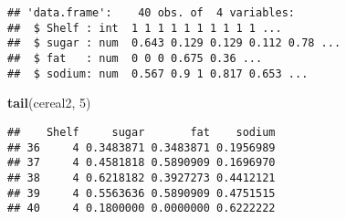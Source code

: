 \documentclass[]{article}
\newenvironment{Shaded}{\begin{snugshade}}{\end{snugshade}}
\newcommand{\DecValTok}[1]{\textcolor[rgb]{0.00,0.00,0.81}{#1}}
\newcommand{\KeywordTok}[1]{\textcolor[rgb]{0.13,0.29,0.53}{\textbf{#1}}}
\newcommand{\NormalTok}[1]{#1}
\begin{document}
\begin{verbatim}
## 'data.frame':    40 obs. of  4 variables:
##  $ Shelf : int  1 1 1 1 1 1 1 1 1 1 ...
##  $ sugar : num  0.643 0.129 0.129 0.112 0.78 ...
##  $ fat   : num  0 0 0 0.675 0.36 ...
##  $ sodium: num  0.567 0.9 1 0.817 0.653 ...
\end{verbatim}

\begin{Shaded}
\begin{Highlighting}[]
\KeywordTok{tail}\NormalTok{(cereal2, }\DecValTok{5}\NormalTok{)}
\end{Highlighting}
\end{Shaded}

\begin{verbatim}
##    Shelf     sugar       fat    sodium
## 36     4 0.3483871 0.3483871 0.1956989
## 37     4 0.4581818 0.5890909 0.1696970
## 38     4 0.6218182 0.3927273 0.4412121
## 39     4 0.5563636 0.5890909 0.4751515
## 40     4 0.1800000 0.0000000 0.6222222
\end{verbatim}
\end{document}
